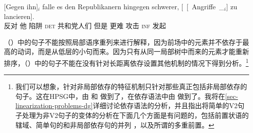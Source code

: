 {\raggedright
\gll {}[Gegen ihn]$_i$ falle es den Republikanern hingegen schwerer, [~[~Angriffe~\_$_i$] zu lancieren].\footnotemark\\
	 {}\spacebr{}反对 他 陷阱 \expl{} \textsc{det} 共和党人们 但是 更难
         \hspaceThis{[~[~}攻击 \textsc{inf} 发起\\
\par}
\zl
（）中的句子不能按照局部语序重列来进行解释，因为前场中的元素并不依存于最高的动词，而是从低层的小句而来。因为只有从同一局部树中而来的元素才能重新排序，（）中的句子不能在没有针对长距离依存设置其他机制的情况下得到分析。\footnote{%
我们可以想象，针对非局部依存的特征机制只针对那些真正包括非局部依存的句子。这在HPSG\indexhpsgc 中，由 \citet{Kathol95a}和 \citet{Wetta2011a}做到了，在依存语法中由 \citet{GO2009a}做到了。我将在\ref{sec-linearization-problems-dg}详细讨论依存语法的分析，并且指出将简单的V2句子处理为非V2句子的变体的分析在下面几个方面是有问题的，包括前置状语的辖域、简单句的和非局部依存句的并列 ，以及所谓的多重前置。
}

